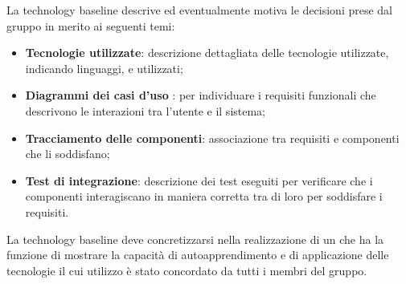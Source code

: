 La technology baseline descrive ed eventualmente motiva le decisioni prese dal gruppo \Gruppo{} in merito ai seguenti temi:

\begin{itemize}
    \item \textbf{Tecnologie utilizzate}: descrizione dettagliata delle tecnologie utilizzate, indicando linguaggi,   e  utilizzati;
    \item \textbf{Diagrammi dei casi d'uso }: per individuare i requisiti funzionali che descrivono le interazioni tra l'utente e il sistema;
    \item \textbf{Tracciamento delle componenti}: associazione tra requisiti e componenti che li soddisfano;
    \item \textbf{Test di integrazione}: descrizione dei test eseguiti per verificare che i componenti interagiscano in maniera corretta tra di loro per soddisfare i requisiti.
\end{itemize}

La technology baseline deve concretizzarsi nella realizzazione di un \emph{} che ha la funzione di mostrare la capacità di autoapprendimento e di applicazione delle tecnologie il cui utilizzo è stato concordato da tutti i membri del gruppo. 
